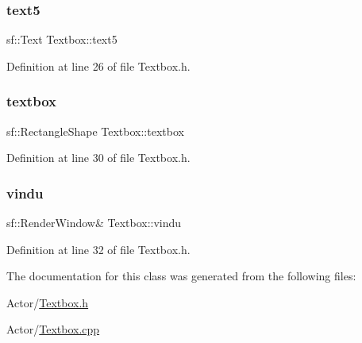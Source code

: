 \subsubsection{\texorpdfstring{text5}{text5}}
{\footnotesize\ttfamily sf\+::\+Text Textbox\+::text5}



Definition at line 26 of file Textbox.\+h.

\hypertarget{class_textbox_a6da196e36384e83b7dc9fa9f81848536}{}\label{class_textbox_a6da196e36384e83b7dc9fa9f81848536} 
\subsubsection{\texorpdfstring{textbox}{textbox}}
{\footnotesize\ttfamily sf\+::\+Rectangle\+Shape Textbox\+::textbox}



Definition at line 30 of file Textbox.\+h.

\hypertarget{class_textbox_a43cc0d802e43397e373997b8595073ad}{}\label{class_textbox_a43cc0d802e43397e373997b8595073ad} 
\subsubsection{\texorpdfstring{vindu}{vindu}}
{\footnotesize\ttfamily sf\+::\+Render\+Window\& Textbox\+::vindu}



Definition at line 32 of file Textbox.\+h.



The documentation for this class was generated from the following files\+:\begin{DoxyCompactItemize}
\item 
Actor/\hyperlink{_textbox_8h}{Textbox.\+h}\item 
Actor/\hyperlink{_textbox_8cpp}{Textbox.\+cpp}\end{DoxyCompactItemize}
